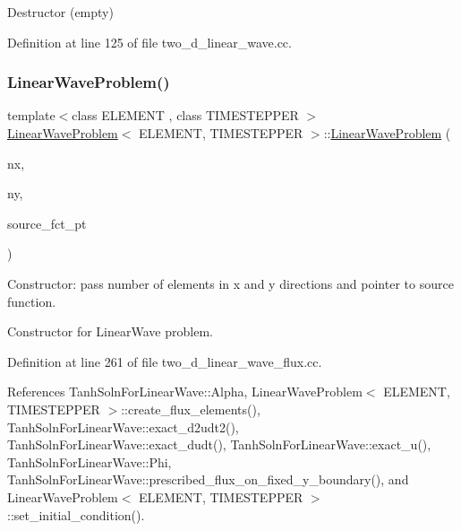 Destructor (empty) 



Definition at line 125 of file two\+\_\+d\+\_\+linear\+\_\+wave.\+cc.

\mbox{\label{classLinearWaveProblem_a8f49994bc293eee5946b79871ee78ea3}} 
\subsubsection{\texorpdfstring{Linear\+Wave\+Problem()}{LinearWaveProblem()}\hspace{0.1cm}{\footnotesize\ttfamily [2/2]}}
{\footnotesize\ttfamily template$<$class E\+L\+E\+M\+E\+NT , class T\+I\+M\+E\+S\+T\+E\+P\+P\+ER $>$ \\
\hyperlink{classLinearWaveProblem}{Linear\+Wave\+Problem}$<$ E\+L\+E\+M\+E\+NT, T\+I\+M\+E\+S\+T\+E\+P\+P\+ER $>$\+::\hyperlink{classLinearWaveProblem}{Linear\+Wave\+Problem} (\begin{DoxyParamCaption}\item[{const unsigned \&}]{nx,  }\item[{const unsigned \&}]{ny,  }\item[{Linear\+Wave\+Equations$<$ 2 $>$\+::Linear\+Wave\+Source\+Fct\+Pt}]{source\+\_\+fct\+\_\+pt }\end{DoxyParamCaption})}



Constructor\+: pass number of elements in x and y directions and pointer to source function. 

Constructor for Linear\+Wave problem. 

Definition at line 261 of file two\+\_\+d\+\_\+linear\+\_\+wave\+\_\+flux.\+cc.



References Tanh\+Soln\+For\+Linear\+Wave\+::\+Alpha, Linear\+Wave\+Problem$<$ E\+L\+E\+M\+E\+N\+T, T\+I\+M\+E\+S\+T\+E\+P\+P\+E\+R $>$\+::create\+\_\+flux\+\_\+elements(), Tanh\+Soln\+For\+Linear\+Wave\+::exact\+\_\+d2udt2(), Tanh\+Soln\+For\+Linear\+Wave\+::exact\+\_\+dudt(), Tanh\+Soln\+For\+Linear\+Wave\+::exact\+\_\+u(), Tanh\+Soln\+For\+Linear\+Wave\+::\+Phi, Tanh\+Soln\+For\+Linear\+Wave\+::prescribed\+\_\+flux\+\_\+on\+\_\+fixed\+\_\+y\+\_\+boundary(), and Linear\+Wave\+Problem$<$ E\+L\+E\+M\+E\+N\+T, T\+I\+M\+E\+S\+T\+E\+P\+P\+E\+R $>$\+::set\+\_\+initial\+\_\+condition().

